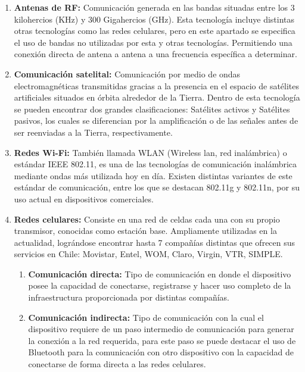 \begin{enumerate}
	\item \textbf{Antenas de RF:}\cite{RF}
	Comunicación generada en las bandas situadas entre los 3 kilohercios (KHz) y 300 Gigahercios (GHz). Esta tecnología incluye distintas otras tecnologías como las redes celulares, pero en este apartado se especifica el uso de bandas no utilizadas por esta y otras tecnologías. Permitiendo una conexión directa de antena a antena a una frecuencia específica a determinar.
	
	\item \textbf{Comunicación satelital:}\cite{satelite}
	Comunicación  por medio de ondas electromagnéticas transmitidas gracias a la presencia en el espacio de satélites artificiales situados en órbita alrededor de la Tierra. Dentro de esta tecnología se pueden encontrar dos grandes clasificaciones: Satélites activos y Satélites pasivos, los cuales se diferencian por la amplificación o de las señales antes de ser reenviadas a la Tierra, respectivamente.
	
	\item \textbf{Redes Wi-Fi:}\cite{wifi}
	También llamada WLAN (Wireless lan, red inalámbrica) o estándar IEEE 802.11, es una de las tecnologías de comunicación inalámbrica mediante ondas más utilizada hoy en día. Existen distintas variantes de este estándar de comunicación, entre los que se destacan 802.11g y 802.11n, por su uso actual en dispositivos comerciales.
	
	\item \textbf{Redes celulares:}\cite{celular}
	Consiste en una red de celdas cada una con su propio transmisor, conocidas como estación base. Ampliamente utilizadas en la actualidad, lográndose encontrar hasta 7 compañías distintas que ofrecen sus servicios en Chile: Movistar, Entel, WOM, Claro, Virgin, VTR, SIMPLE.
	\begin{enumerate}
		\item \textbf{Comunicación directa:}
		Tipo de comunicación en donde el dispositivo posee la capacidad de conectarse, registrarse y hacer uso completo de la infraestructura proporcionada por distintas compañías.
		
		\item \textbf{Comunicación indirecta:}
		Tipo de comunicación con la cual el dispositivo requiere de un paso intermedio de comunicación para generar la conexión a la red requerida, para este paso se puede destacar el uso de Bluetooth para la comunicación con otro dispositivo con la capacidad de conectarse de forma directa a las redes celulares.
	\end{enumerate}	
\end{enumerate}	

